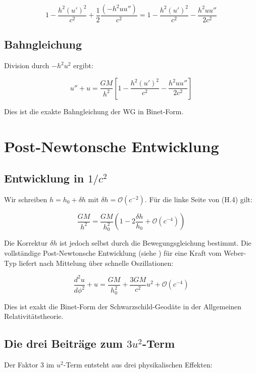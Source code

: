 \[
1 - \frac{h^2 (u')^2}{c^2} + \frac{1}{2} \frac{(-h^2 u u'')}{c^2} = 
1 - \frac{h^2 (u')^2}{c^2} - \frac{h^2 u u''}{2c^2}
\]

\subsection{Bahngleichung}
\label{sub:periheldrehung_bahngleichung}

Division durch \( -h^2 u^2 \) ergibt:

\[
u'' + u = \frac{GM}{h^2} \left[ 1 - \frac{h^2 (u')^2}{c^2} - \frac{h^2 u u''}{2c^2} \right] \tag{H.4}
\]

Dies ist die exakte Bahngleichung der WG in Binet-Form.

\section{Post-Newtonsche Entwicklung}
\label{app:periheldrehung_postnewton}

\subsection{Entwicklung in \( 1/c^2 \)}
\label{sub:periheldrehung_entwicklung}

Wir schreiben \( h = h_0 + \delta h \) mit \( \delta h = \mathcal{O}(c^{-2}) \). 
Für die linke Seite von (H.4) gilt:

\[
\frac{GM}{h^2} = \frac{GM}{h_0^2} \left(1 - 2\frac{\delta h}{h_0} + \mathcal{O}(c^{-4})\right)
\]

Die Korrektur \( \delta h \) ist jedoch selbst durch die Bewegungsgleichung 
bestimmt. Die vollständige Post-Newtonsche Entwicklung (siehe \cite{WillNordtvedt1972}) 
für eine Kraft vom Weber-Typ liefert nach Mittelung über schnelle Oszillationen:

\[
\frac{d^2u}{d\phi^2} + u = \frac{GM}{h_0^2} + \frac{3GM}{c^2} u^2 + \mathcal{O}(c^{-4}) \tag{H.5}
\]

Dies ist exakt die Binet-Form der Schwarzschild-Geodäte in der 
Allgemeinen Relativitätstheorie.

\subsection{Die drei Beiträge zum \( 3u^2 \)-Term}
\label{sub:periheldrehung_drei_beitraege}

Der Faktor 3 im \( u^2 \)-Term entsteht aus drei physikalischen Effekten:

